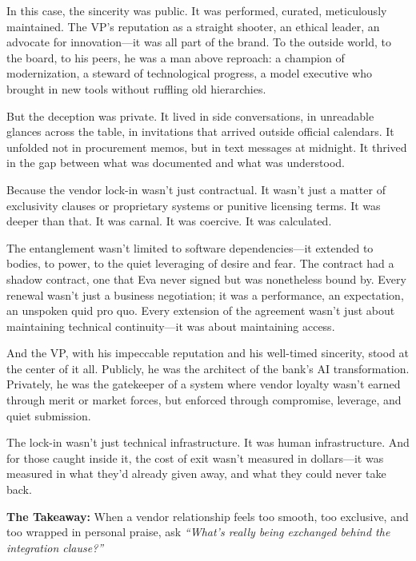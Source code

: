 In this case, the sincerity was public. It was performed, curated, meticulously maintained. The VP’s reputation as a straight shooter, an ethical leader, an advocate for innovation—it was all part of the brand. To the outside world, to the board, to his peers, he was a man above reproach: a champion of modernization, a steward of technological progress, a model executive who brought in new tools without ruffling old hierarchies.

But the deception was private. It lived in side conversations, in unreadable glances across the table, in invitations that arrived outside official calendars. It unfolded not in procurement memos, but in text messages at midnight. It thrived in the gap between what was documented and what was understood.

Because the vendor lock-in wasn’t just contractual. It wasn’t just a matter of exclusivity clauses or proprietary systems or punitive licensing terms. It was deeper than that. It was carnal. It was coercive. It was calculated.

The entanglement wasn’t limited to software dependencies—it extended to bodies, to power, to the quiet leveraging of desire and fear. The contract had a shadow contract, one that Eva never signed but was nonetheless bound by. Every renewal wasn’t just a business negotiation; it was a performance, an expectation, an unspoken quid pro quo. Every extension of the agreement wasn’t just about maintaining technical continuity—it was about maintaining access.

And the VP, with his impeccable reputation and his well-timed sincerity, stood at the center of it all. Publicly, he was the architect of the bank’s AI transformation. Privately, he was the gatekeeper of a system where vendor loyalty wasn’t earned through merit or market forces, but enforced through compromise, leverage, and quiet submission.

The lock-in wasn’t just technical infrastructure. It was human infrastructure. And for those caught inside it, the cost of exit wasn’t measured in dollars—it was measured in what they’d already given away, and what they could never take back.

\medskip

\textbf{The Takeaway:}  When a vendor relationship feels too smooth, too exclusive, and too wrapped in personal praise, ask \textit{``What’s really being exchanged behind the integration clause?''}

  





